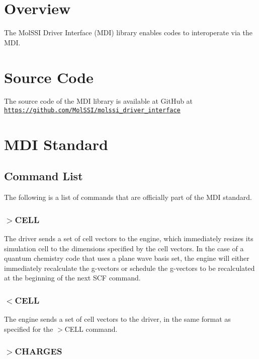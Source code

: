 \hypertarget{index_overview_sec}{}\section{Overview}\label{index_overview_sec}
The Mol\-S\-S\-I Driver Interface (M\-D\-I) library enables codes to interoperate via the M\-D\-I.\hypertarget{index_source_sec}{}\section{Source Code}\label{index_source_sec}
The source code of the M\-D\-I library is available at Git\-Hub at \href{https://github.com/MolSSI/molssi_driver_interface}{\tt https\-://github.\-com/\-Mol\-S\-S\-I/molssi\-\_\-driver\-\_\-interface}\hypertarget{index_commands_sec}{}\section{M\-D\-I Standard}\label{index_commands_sec}
\hypertarget{index_command_list}{}\subsection{Command List}\label{index_command_list}
The following is a list of commands that are officially part of the M\-D\-I standard.\hypertarget{index_set_cell}{}\subsubsection{$>$\-C\-E\-L\-L}\label{index_set_cell}
The driver sends a set of cell vectors to the engine, which immediately resizes its simulation cell to the dimensions specified by the cell vectors. In the case of a quantum chemistry code that uses a plane wave basis set, the engine will either immediately recalculate the g-\/vectors or schedule the g-\/vectors to be recalculated at the beginning of the next S\-C\-F command.\hypertarget{index_recv_cell}{}\subsubsection{$<$\-C\-E\-L\-L}\label{index_recv_cell}
The engine sends a set of cell vectors to the driver, in the same format as specified for the {\ttfamily $>$C\-E\-L\-L} command.\hypertarget{index_send_charges}{}\subsubsection{$>$\-C\-H\-A\-R\-G\-E\-S}\label{index_send_charges}
